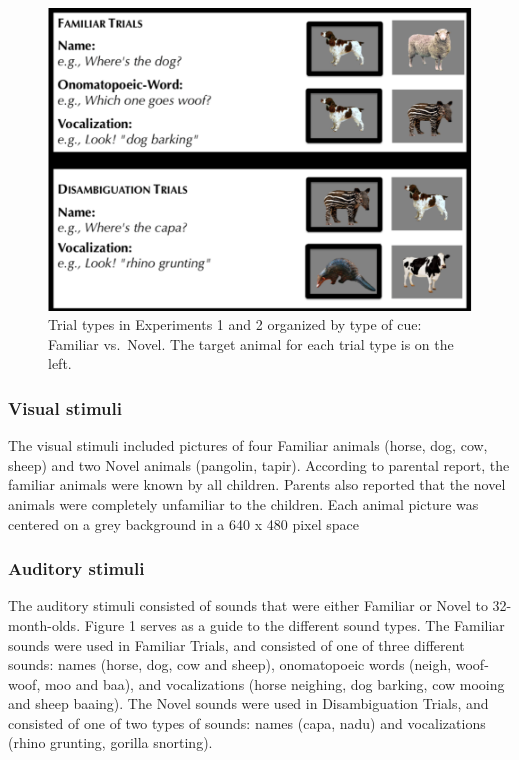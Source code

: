 \documentclass[english,floatsintext,man]{apa6}
\theoremstyle{definition}
\theoremstyle{definition}
\theoremstyle{definition}
\theoremstyle{remark}
\begin{document}
\begin{figure}
\centering
\includegraphics{anime_manuscript_files/figure-latex/stimuli-e1-1.pdf}
\caption{\label{fig:stimuli-e1}Trial types in Experiments 1 and 2 organized
by type of cue: Familiar vs.~Novel. The target animal for each trial
type is on the left.}
\end{figure}

\subsubsection{Visual stimuli}\label{visual-stimuli}

The visual stimuli included pictures of four Familiar animals (horse,
dog, cow, sheep) and two Novel animals (pangolin, tapir). According to
parental report, the familiar animals were known by all children.
Parents also reported that the novel animals were completely unfamiliar
to the children. Each animal picture was centered on a grey background
in a 640 x 480 pixel space

\subsubsection{Auditory stimuli}\label{auditory-stimuli}

The auditory stimuli consisted of sounds that were either Familiar or
Novel to 32-month-olds. Figure 1 serves as a guide to the different
sound types. The Familiar sounds were used in Familiar Trials, and
consisted of one of three different sounds: names (horse, dog, cow and
sheep), onomatopoeic words (neigh, woof-woof, moo and baa), and
vocalizations (horse neighing, dog barking, cow mooing and sheep
baaing). The Novel sounds were used in Disambiguation Trials, and
consisted of one of two types of sounds: names (capa, nadu) and
vocalizations (rhino grunting, gorilla snorting).
\end{document}

